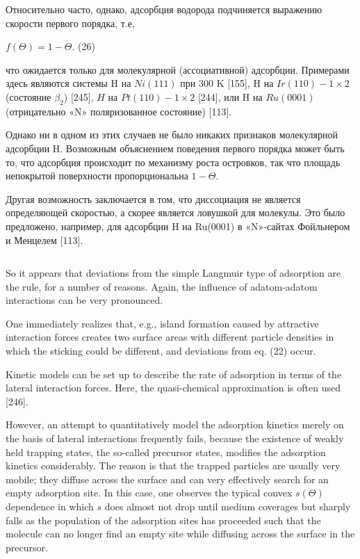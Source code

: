 \documentclass[11pt]{article}
\makeatletter
\newcommand{\boxspacing}{\kern\kvtcb@left@rule\kern\kvtcb@boxsep}
\newcommand{\prompt}[4]{
        {\ttfamily\llap{{\color{#2}[#3]:\hspace{3pt}#4}}\vspace{-\baselineskip}}
    }
\makeatother
\begin{document}
Относительно часто, однако, адсорбция водорода подчиняется выражению
скорости первого порядка, т.е,

\(f\left(\Theta\right) = 1 - \Theta\). (26)

что ожидается только для молекулярной (ассоциативной) адсорбции.
Примерами здесь являются системы H на \(Ni(111)\) при 300 K {[}155{]}, H
на \(Ir(110)-1 \times 2\) (состояние \(\beta_2\)) {[}245{]}, \(H\) на
\(Pt(110)-1 \times 2\) {[}244{]}, или H на \(Ru(0001)\) (отрицательно
«N» поляризованное состояние) {[}113{]}.

Однако ни в одном из этих случаев не было никаких признаков молекулярной
адсорбции H. Возможным объяснением поведения первого порядка может быть
то, что адсорбция происходит по механизму роста островков, так что
площадь непокрытой поверхности пропорциональна \(1 - \Theta\).

Другая возможность заключается в том, что диссоциация не является
определяющей скоростью, а скорее является ловушкой для молекулы. Это
было предложено, например, для адсорбции H на Ru(0001) в «N»-сайтах
Фойльнером и Менцелем {[}113{]}.

    \begin{tcolorbox}[breakable, size=fbox, boxrule=1pt, pad at break*=1mm,colback=cellbackground, colframe=cellborder]
\prompt{In}{incolor}{ }{\boxspacing}
\begin{Verbatim}[commandchars=\\\{\}]

\end{Verbatim}
\end{tcolorbox}

    So it appears that deviations from the simple Langmuir type of
adsorption are the rule, for a number of reasons. Again, the influence
of adatom-adatom interactions can be very pronounced.

One immediately realizes that, e.g., island formation caused by
attractive interaction forces creates two surface areas with different
particle densities in which the sticking could be different, and
deviations from eq. (22) occur.

Kinetic models can be set up to describe the rate of adsorption in terms
of the lateral interaction forces. Here, the quasi-chemical
approximation is often used {[}246{]}.

However, an attempt to quantitatively model the adsorption kinetics
merely on the basis of lateral interactions frequently fails, because
the existence of weakly held trapping states, the so-called precursor
states, modifies the adsorption kinetics considerably. The reason is
that the trapped particles are usually very mobile; they diffuse across
the surface and can very effectively search for an empty adsorption
site. In this case, one observes the typical convex \(s(\Theta)\)
dependence in which \(s\) does almost not drop until medium coverages
but sharply falls as the population of the adsorption sites has
proceeded such that the molecule can no longer find an empty site while
diffusing across the surface in the precursor.
\end{document}
